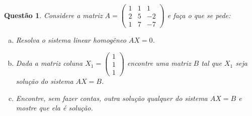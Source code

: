 \documentclass[a4paper,10pt]{article}
\newtheorem{qst}{Questão}
\begin{document}
\begin{qst}
	Considere a matriz $A=\begin{pmatrix}
	1&1&1\\2&5&-2\\1&7&-7
	\end{pmatrix}$ e faça o que se pede:
	\begin{enumerate}[a)]
		\item Resolva o sistema linear homogêneo $AX=0$.
		\item Dada a matriz coluna $X_1=\begin{pmatrix}
		1\\1\\1
		\end{pmatrix}$ encontre uma matriz $B$ tal que $X_1$ seja solução do sistema $AX=B$.
		\item Encontre, sem fazer contas, outra solução qualquer do sistema $AX=B$ e mostre que ela é solução.
	\end{enumerate}
\end{qst}
\end{document}
